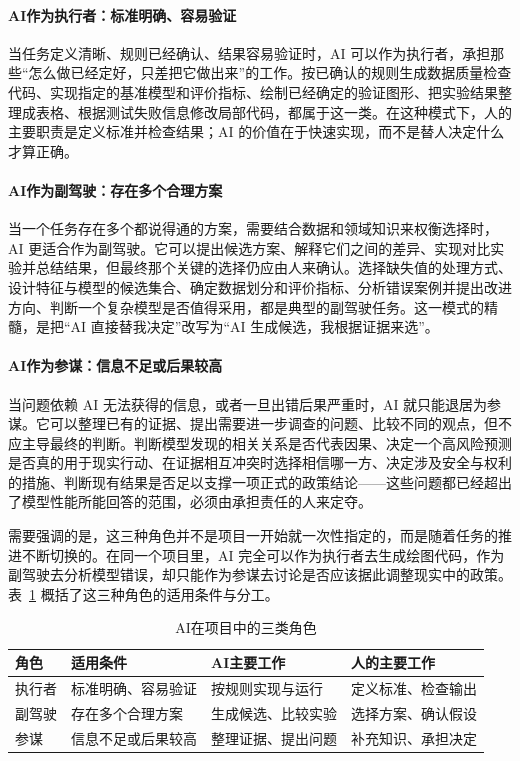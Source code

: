 \paragraph{AI作为执行者：标准明确、容易验证}
当任务定义清晰、规则已经确认、结果容易验证时，AI 可以作为执行者，承担那些“怎么做已经定好，只差把它做出来”的工作。按已确认的规则生成数据质量检查代码、实现指定的基准模型和评价指标、绘制已经确定的验证图形、把实验结果整理成表格、根据测试失败信息修改局部代码，都属于这一类。在这种模式下，人的主要职责是定义标准并检查结果；AI 的价值在于快速实现，而不是替人决定什么才算正确。

\paragraph{AI作为副驾驶：存在多个合理方案}
当一个任务存在多个都说得通的方案，需要结合数据和领域知识来权衡选择时，AI 更适合作为副驾驶。它可以提出候选方案、解释它们之间的差异、实现对比实验并总结结果，但最终那个关键的选择仍应由人来确认。选择缺失值的处理方式、设计特征与模型的候选集合、确定数据划分和评价指标、分析错误案例并提出改进方向、判断一个复杂模型是否值得采用，都是典型的副驾驶任务。这一模式的精髓，是把“AI 直接替我决定”改写为“AI 生成候选，我根据证据来选”。

\paragraph{AI作为参谋：信息不足或后果较高}
当问题依赖 AI 无法获得的信息，或者一旦出错后果严重时，AI 就只能退居为参谋。它可以整理已有的证据、提出需要进一步调查的问题、比较不同的观点，但不应主导最终的判断。判断模型发现的相关关系是否代表因果、决定一个高风险预测是否真的用于现实行动、在证据相互冲突时选择相信哪一方、决定涉及安全与权利的措施、判断现有结果是否足以支撑一项正式的政策结论——这些问题都已经超出了模型性能所能回答的范围，必须由承担责任的人来定夺。

需要强调的是，这三种角色并不是项目一开始就一次性指定的，而是随着任务的推进不断切换的。在同一个项目里，AI 完全可以作为执行者去生成绘图代码，作为副驾驶去分析模型错误，却只能作为参谋去讨论是否应该据此调整现实中的政策。表~\ref{tab:ai_roles} 概括了这三种角色的适用条件与分工。

\begin{table}[htbp]
\centering
\caption{AI在项目中的三类角色}
\label{tab:ai_roles}
\small
\begin{tabular}{p{}p{}p{}p{}}
\toprule
角色 & 适用条件 & AI主要工作 & 人的主要工作 \\
\midrule
执行者 & 标准明确、容易验证 & 按规则实现与运行 & 定义标准、检查输出 \\
副驾驶 & 存在多个合理方案 & 生成候选、比较实验 & 选择方案、确认假设 \\
参谋 & 信息不足或后果较高 & 整理证据、提出问题 & 补充知识、承担决定 \\
\bottomrule
\end{tabular}
\end{table}

